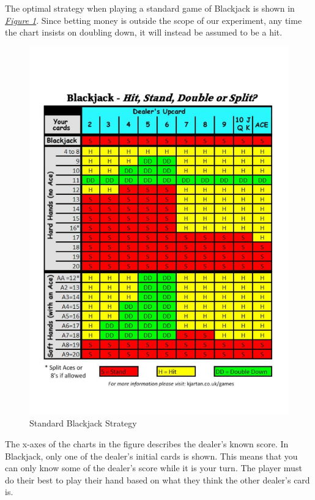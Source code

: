 \documentclass{article}
\begin{document}
{		The optimal strategy when playing a standard game of Blackjack is shown in \hyperlink{fig1}{\textit{Figure 1}}.
		Since betting money is outside the scope of our experiment, any time the chart insists on doubling down, 
		it will instead be assumed to be a hit.
		
		\begin{figure}[H]
			\begin{center}
				\hypertarget{fig1}{}
				\includegraphics[width=12cm]{blackjack-chart.png}
				\vspace*{-12mm}
				\caption{Standard Blackjack Strategy}
			\end{center}
		\end{figure}


		The x-axes of the charts in the figure describes the dealer's known score. In Blackjack, only one of the dealer's
		initial cards is shown. This means that you can only know some of the dealer's score while it is your turn.
		The player must do their best to play their hand based on what they think the other dealer's card is.
		
}
\end{document}
